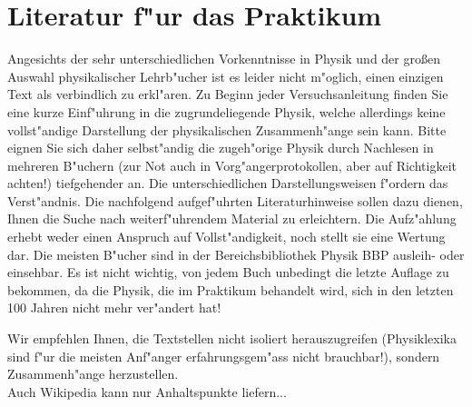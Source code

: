 

\chapter{Literatur f"ur das Praktikum}


Angesichts der sehr unterschiedlichen Vorkenntnisse in Physik und der gro{\ss}en Auswahl physikalischer Lehrb"ucher ist es leider nicht m"oglich, einen einzigen Text als verbindlich zu erkl"aren. Zu Beginn jeder Versuchsanleitung finden Sie eine kurze Einf"uhrung in die zugrundeliegende Physik, welche allerdings keine vollst"andige Darstellung der physikalischen Zusammenh"ange sein kann. Bitte eignen Sie sich daher selbst"andig die zugeh"orige Physik durch Nachlesen in mehreren B"uchern (zur Not auch in Vorg"angerprotokollen, aber auf Richtigkeit achten!) tiefgehender an. Die unterschiedlichen Darstellungsweisen f"ordern das Verst"andnis. Die nachfolgend  aufgef"uhrten Literaturhinweise sollen dazu  dienen, Ihnen die Suche nach weiterf"uhrendem Material zu erleichtern. Die Aufz"ahlung erhebt weder einen Anspruch auf Vollst"andigkeit, noch stellt sie eine Wertung dar. Die meisten B"ucher sind in der Bereichsbibliothek Physik \textsc{BBP} ausleih- oder einsehbar. Es ist nicht wichtig, von jedem Buch unbedingt die letzte Auflage zu bekommen, da die Physik, die im Praktikum behandelt wird, sich in den letzten 100 Jahren nicht mehr ver"andert hat!

\noindent
Wir empfehlen  Ihnen, die Textstellen nicht isoliert herauszugreifen (Physiklexika sind f"ur die meisten Anf"anger erfahrungsgem"ass nicht  brauchbar!),  sondern Zusammenh"ange herzustellen.   \\
Auch Wikipedia kann nur Anhaltspunkte liefern...



